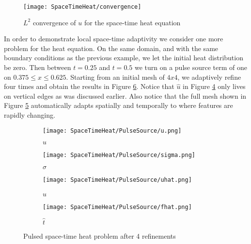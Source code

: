 \documentclass[Proposal.tex]{subfiles}
\begin{document}
\begin{figure}[!ht]
	\centering
	\texttt{[image: SpaceTimeHeat/convergence]}
	\caption{$L^2$ convergence of $u$ for the space-time heat equation}
	\label{fig:spaceTimeHeatConvergence}
\end{figure}

In order to demonstrate local space-time adaptivity we consider one more problem for the heat equation. 
On the same domain, and with the same boundary conditions as the previous example, we let the initial heat distribution be zero.
Then between $t=0.25$ and $t=0.5$ we turn on a pulse source term of one on $0.375\leq x\leq 0.625$. 
Starting from an initial mesh of $4x4$, we adaptively refine four times and obtain the results in Figure \ref{fig:spaceTimeHeatPulse}.
Notice that $\hat u$ in Figure \ref{fig:spaceTimeHeatuhat} only lives on vertical edges as was discussed earlier.
Also notice that the full mesh shown in Figure \ref{fig:spaceTimeHeatfhat} automatically adapts spatially and temporally to where features are rapidly changing. 

\begin{figure}[ht]
\centering
\begin{subfigure}[t]{0.45\textwidth}
\centering
\texttt{[image: SpaceTimeHeat/PulseSource/u.png]}
\caption{$u$}
\label{fig:spaceTimeHeatu}
\end{subfigure}
\begin{subfigure}[t]{0.45\textwidth}
\centering
\texttt{[image: SpaceTimeHeat/PulseSource/sigma.png]}
\caption{$\sigma$}
\label{fig:spaceTimeHeatsigma}
\end{subfigure}
\begin{subfigure}[t]{0.45\textwidth}
\centering
\texttt{[image: SpaceTimeHeat/PulseSource/uhat.png]}
\caption{$\hat u$}
\label{fig:spaceTimeHeatuhat}
\end{subfigure}
\begin{subfigure}[t]{0.45\textwidth}
\centering
\texttt{[image: SpaceTimeHeat/PulseSource/fhat.png]}
\caption{$\hat t$}
\label{fig:spaceTimeHeatfhat}
\end{subfigure}
\caption{Pulsed space-time heat problem after 4 refinements}
\label{fig:spaceTimeHeatPulse}
\end{figure}

%                                                                                      
%                                                                                      
%        
\end{document}
